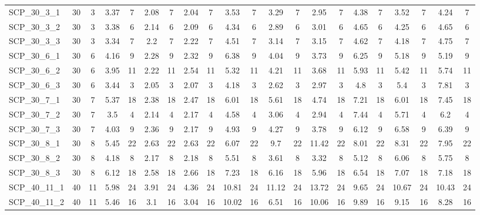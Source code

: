 \begin{sidewaystable}[!ht]
{\begin{tabular}{lcccccccccccccccccccc}
SCP\_30\_3\_1 & 30 & 3 & 3.37 & 7 & 2.08 & 7 &  \textcolor{blue2}{2.04} & 7 & 3.53 & 7 & 3.29 & 7 & 2.95 & 7 & 4.38 & 7 & 3.52 & 7 & 4.24 & 7 \\
SCP\_30\_3\_2 & 30 & 3 & 3.38 & 6 & 2.14 & 6 &  \textcolor{blue2}{2.09} & 6 & 4.34 & 6 & 2.89 & 6 & 3.01 & 6 & 4.65 & 6 & 4.25 & 6 & 4.65 & 6 \\
SCP\_30\_3\_3 & 30 & 3 & 3.34 & 7 &  \textcolor{blue2}{2.2} & 7 & 2.22 & 7 & 4.51 & 7 & 3.14 & 7 & 3.15 & 7 & 4.62 & 7 & 4.18 & 7 & 4.75 & 7 \\
SCP\_30\_6\_1 & 30 & 6 & 4.16 & 9 &  \textcolor{blue2}{2.28} & 9 & 2.32 & 9 & 6.38 & 9 & 4.04 & 9 & 3.73 & 9 & 6.25 & 9 & 5.18 & 9 & 5.19 & 9 \\
SCP\_30\_6\_2 & 30 & 6 & 3.95 & 11 &  \textcolor{blue2}{2.22} & 11 & 2.54 & 11 & 5.32 & 11 & 4.21 & 11 & 3.68 & 11 & 5.93 & 11 & 5.42 & 11 & 5.74 & 11 \\
SCP\_30\_6\_3 & 30 & 6 & 3.44 & 3 &  \textcolor{blue2}{2.05} & 3 & 2.07 & 3 & 4.18 & 3 & 2.62 & 3 & 2.97 & 3 & 4.8 & 3 & 5.4 & 3 & 7.81 & 3 \\
SCP\_30\_7\_1 & 30 & 7 & 5.37 & 18 &  \textcolor{blue2}{2.38} & 18 & 2.47 & 18 & 6.01 & 18 & 5.61 & 18 & 4.74 & 18 & 7.21 & 18 & 6.01 & 18 & 7.45 & 18 \\
SCP\_30\_7\_2 & 30 & 7 & 3.5 & 4 &  \textcolor{blue2}{2.14} & 4 & 2.17 & 4 & 4.58 & 4 & 3.06 & 4 & 2.94 & 4 & 7.44 & 4 & 5.71 & 4 & 6.2 & 4 \\
SCP\_30\_7\_3 & 30 & 7 & 4.03 & 9 & 2.36 & 9 &  \textcolor{blue2}{2.17} & 9 & 4.93 & 9 & 4.27 & 9 & 3.78 & 9 & 6.12 & 9 & 6.58 & 9 & 6.39 & 9 \\
SCP\_30\_8\_1 & 30 & 8 & 5.45 & 22 &  \textcolor{blue2}{2.63} & 22 &  \textcolor{blue2}{2.63} & 22 & 6.07 & 22 & 9.7 & 22 & 11.42 & 22 & 8.01 & 22 & 8.31 & 22 & 7.95 & 22 \\
SCP\_30\_8\_2 & 30 & 8 & 4.18 & 8 &  \textcolor{blue2}{2.17} & 8 & 2.18 & 8 & 5.51 & 8 & 3.61 & 8 & 3.32 & 8 & 5.12 & 8 & 6.06 & 8 & 5.75 & 8 \\
SCP\_30\_8\_3 & 30 & 8 & 6.12 & 18 &  \textcolor{blue2}{2.58} & 18 & 2.66 & 18 & 7.23 & 18 & 6.16 & 18 & 5.96 & 18 & 6.54 & 18 & 7.07 & 18 & 7.18 & 18 \\
SCP\_40\_11\_1 & 40 & 11 & 5.98 & 24 &  \textcolor{blue2}{3.91} & 24 & 4.36 & 24 & 10.81 & 24 & 11.12 & 24 & 13.72 & 24 & 9.65 & 24 & 10.67 & 24 & 10.43 & 24 \\
SCP\_40\_11\_2 & 40 & 11 & 5.46 & 16 & 3.1 & 16 &  \textcolor{blue2}{3.04} & 16 & 10.02 & 16 & 6.51 & 16 & 10.06 & 16 & 9.89 & 16 & 9.15 & 16 & 8.28 & 16 \\

\end{tabular}}
\end{sidewaystable}
